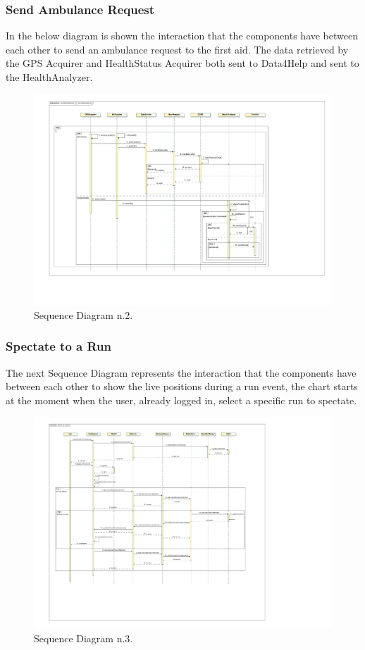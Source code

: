 \subsubsection{Send Ambulance Request}
In the below diagram is shown the interaction that the components have between each other to send an ambulance request to the first aid. The data retrieved by the GPS Acquirer and HealthStatus Acquirer both sent to Data4Help and sent to the HealthAnalyzer.
\\[0.5cm]
\begin{figure}[H]
\centering
\includegraphics[scale=0.9, angle=90,origin=c]{Images/SequenceDiagrams/SendAmbulance.pdf}
\caption{Sequence Diagram n.2.}
\end{figure}
\newpage
\subsubsection{Spectate to a Run}
The next Sequence Diagram represents the interaction that the components have between each other to show the live positions during a run event, the chart starts at the moment when the user, already logged in, select a specific run to spectate.
\begin{figure}[H]
\centering
\includegraphics[scale=1, angle=90,origin=c]{Images/SequenceDiagrams/SpectateRun.pdf}
\caption{Sequence Diagram n.3.}
\end{figure}
\clearpage


